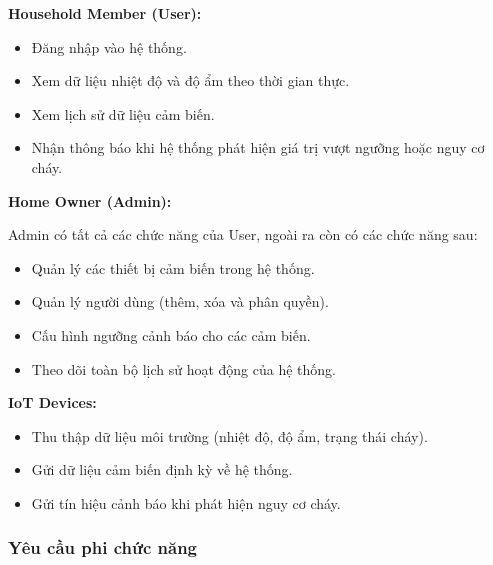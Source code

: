 \documentclass[a4paper,twoside]{article}
\begin{document}
\textbf{Household Member (User):}

\begin{itemize}

\item Đăng nhập vào hệ thống.

\item Xem dữ liệu nhiệt độ và độ ẩm theo thời gian thực.

\item Xem lịch sử dữ liệu cảm biến.

\item Nhận thông báo khi hệ thống phát hiện giá trị
vượt ngưỡng hoặc nguy cơ cháy.

\end{itemize}

\textbf{Home Owner (Admin):}

Admin có tất cả các chức năng của User,
ngoài ra còn có các chức năng sau:

\begin{itemize}

\item Quản lý các thiết bị cảm biến trong hệ thống.

\item Quản lý người dùng (thêm, xóa và phân quyền).

\item Cấu hình ngưỡng cảnh báo cho các cảm biến.

\item Theo dõi toàn bộ lịch sử hoạt động của hệ thống.

\end{itemize}

\textbf{IoT Devices:}

\begin{itemize}

\item Thu thập dữ liệu môi trường (nhiệt độ, độ ẩm, trạng thái cháy).

\item Gửi dữ liệu cảm biến định kỳ về hệ thống.

\item Gửi tín hiệu cảnh báo khi phát hiện nguy cơ cháy.

\end{itemize}

\subsubsection{Yêu cầu phi chức năng}
\end{document}

